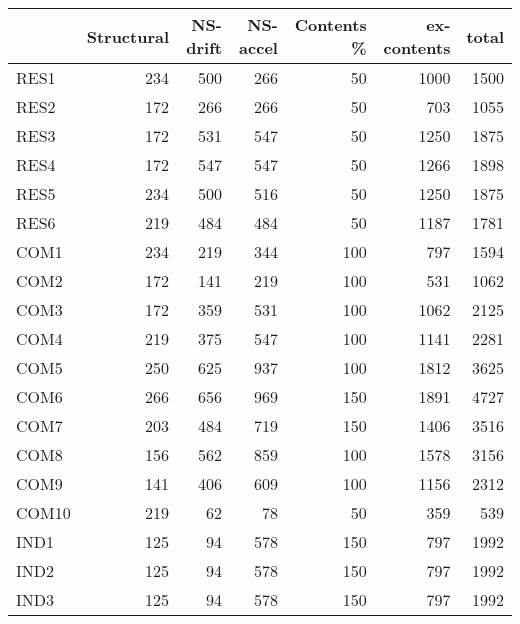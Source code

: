 \begin{tabular}{l|rrr|r|rr}
\hline
           & Structural &   NS-drift &   NS-accel &   Contents \% & ex-contents  &      total \\
\hline
     RES1  &        234 &        500 &        266 &         50 &       1000 &       1500 \\
     RES2  &        172 &        266 &        266 &         50 &        703 &       1055 \\
     RES3  &        172 &        531 &        547 &         50 &       1250 &       1875 \\
     RES4  &        172 &        547 &        547 &         50 &       1266 &       1898 \\
     RES5  &        234 &        500 &        516 &         50 &       1250 &       1875 \\
     RES6  &        219 &        484 &        484 &         50 &       1187 &       1781 \\
     COM1  &        234 &        219 &        344 &        100 &        797 &       1594 \\
     COM2  &        172 &        141 &        219 &        100 &        531 &       1062 \\
     COM3  &        172 &        359 &        531 &        100 &       1062 &       2125 \\
     COM4  &        219 &        375 &        547 &        100 &       1141 &       2281 \\
     COM5  &        250 &        625 &        937 &        100 &       1812 &       3625 \\
     COM6  &        266 &        656 &        969 &        150 &       1891 &       4727 \\
     COM7  &        203 &        484 &        719 &        150 &       1406 &       3516 \\
     COM8  &        156 &        562 &        859 &        100 &       1578 &       3156 \\
     COM9  &        141 &        406 &        609 &        100 &       1156 &       2312 \\
     COM10 &        219 &         62 &         78 &         50 &        359 &        539 \\
     IND1  &        125 &         94 &        578 &        150 &        797 &       1992 \\
     IND2  &        125 &         94 &        578 &        150 &        797 &       1992 \\
     IND3  &        125 &         94 &        578 &        150 &        797 &       1992 \\

\end{tabular}
